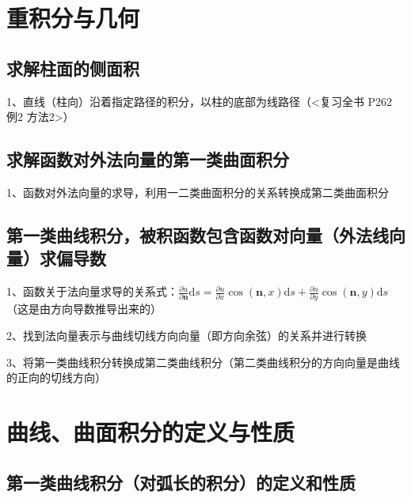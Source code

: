 \section{重积分与几何}



\subsection{求解柱面的侧面积}

1、直线（柱向）沿着指定路径的积分，以柱的底部为线路径（<复习全书 P262 例2 方法2>）



\subsection{求解函数对外法向量的第一类曲面积分}

1、函数对外法向量的求导，利用一二类曲面积分的关系转换成第二类曲面积分



\subsection{第一类曲线积分，被积函数包含函数对向量（外法线向量）求偏导数}

1、函数关于法向量求导的关系式：$\frac{\partial u}{\partial \boldsymbol{n}} \mathrm{d} s=\frac{\partial u}{\partial x} \cos (\boldsymbol{n}, x) \mathrm{d} s+\frac{\partial u}{\partial y} \cos (\boldsymbol{n}, y) \mathrm{d} s$（这是由方向导数推导出来的）

2、找到法向量表示与曲线切线方向向量（即方向余弦）的关系并进行转换

3、将第一类曲线积分转换成第二类曲线积分（第二类曲线积分的方向向量是曲线的正向的切线方向）

\section{曲线、曲面积分的定义与性质}



\subsection{第一类曲线积分（对弧长的积分）的定义和性质}

